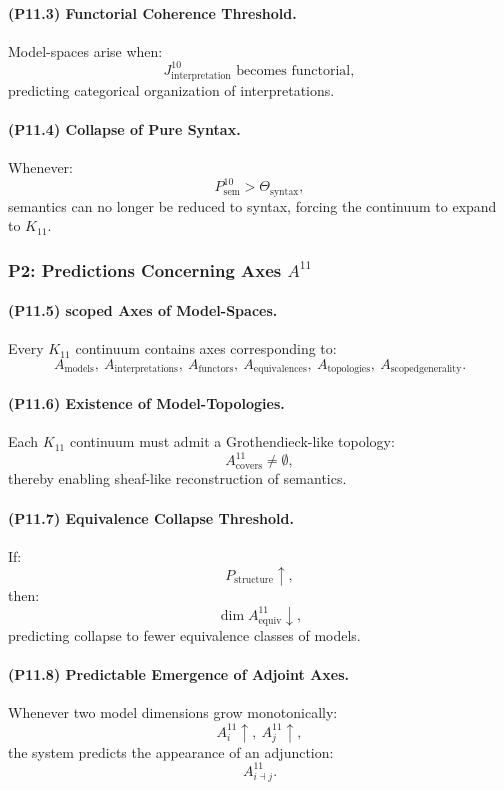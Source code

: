 \paragraph{(P11.3) Functorial Coherence Threshold.}
Model-spaces arise when:
\[
J_{\mathrm{interpretation}}^{10} 
\text{ becomes functorial},
\]
predicting categorical organization of interpretations.

\paragraph{(P11.4) Collapse of Pure Syntax.}
Whenever:
\[
P_{\mathrm{sem}}^{10} > \Theta_{\mathrm{syntax}},
\]
semantics can no longer be reduced to syntax,  
forcing the continuum to expand to $K_{11}$.

\subsubsection{P2: Predictions Concerning Axes $A^{11}$}

\paragraph{(P11.5) scoped Axes of Model-Spaces.}
Every $K_{11}$ continuum contains axes corresponding to:
\[
A_{\mathrm{models}},\
A_{\mathrm{interpretations}},\
A_{\mathrm{functors}},\
A_{\mathrm{equivalences}},\
A_{\mathrm{topologies}},\
A_{\mathrm{scoped generality}}.
\]

\paragraph{(P11.6) Existence of Model-Topologies.}
Each $K_{11}$ continuum must admit a Grothendieck-like topology:
\[
A_{\mathrm{covers}}^{11} \neq \emptyset,
\]
thereby enabling sheaf-like reconstruction of semantics.

\paragraph{(P11.7) Equivalence Collapse Threshold.}
If:
\[
P_{\mathrm{structure}} \uparrow,
\]
then:
\[
\dim A_{\mathrm{equiv}}^{11} \downarrow,
\]
predicting collapse to fewer equivalence classes of models.

\paragraph{(P11.8) Predictable Emergence of Adjoint Axes.}
Whenever two model dimensions grow monotonically:
\[
A_i^{11} \uparrow,\ 
A_j^{11} \uparrow,
\]
the system predicts the appearance of an adjunction:
\[
A_{i \dashv j}^{11}.
\]

